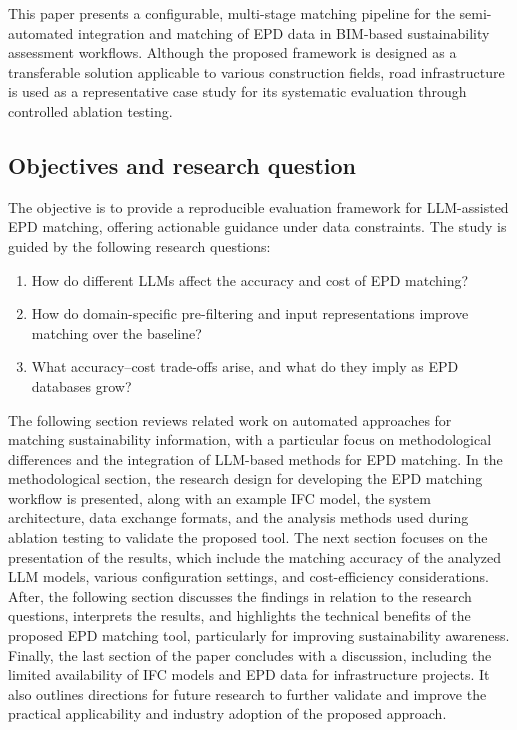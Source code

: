 \documentclass[10pt, a4paper, twocolumn]{article}
\begin{document}
This paper presents a configurable, multi-stage matching pipeline for the semi-automated integration and matching of EPD data in BIM-based sustainability assessment workflows. Although the proposed framework is designed as a transferable solution applicable to various construction fields, road infrastructure is used as a representative case study for its systematic evaluation through controlled ablation testing.

\subsection{Objectives and research question}

The objective is to provide a reproducible evaluation framework for LLM-assisted EPD matching, offering actionable guidance under data constraints. The study is guided by the following research questions:

\begin{enumerate}[label=\textbf{RQ\arabic*:}, leftmargin=*, labelsep=0.5em,
                  itemsep=2pt, topsep=3pt]
  \item How do different LLMs affect the accuracy and cost of EPD matching?
  \item How do domain-specific pre-filtering and input representations improve
        matching over the baseline?
  \item What accuracy--cost trade-offs arise, and what do they imply as EPD
        databases grow?
\end{enumerate}

The following section reviews related work on automated approaches for matching sustainability information, with a particular focus on methodological differences and the integration of LLM-based methods for EPD matching. In the methodological section, the research design for developing the EPD matching workflow is presented, along with an example IFC model, the system architecture, data exchange formats, and the analysis methods used during ablation testing to validate the proposed tool. The next section focuses on the presentation of the results, which include the matching accuracy of the analyzed LLM models, various configuration settings, and cost-efficiency considerations. After, the following section discusses the findings in relation to the research questions, interprets the results, and highlights the technical benefits of the proposed EPD matching tool, particularly for improving sustainability awareness. Finally, the last section of the paper concludes with a discussion, including the limited availability of IFC models and EPD data for infrastructure projects. It also outlines directions for future research to further validate and improve the practical applicability and industry adoption of the proposed approach.
\end{document}
